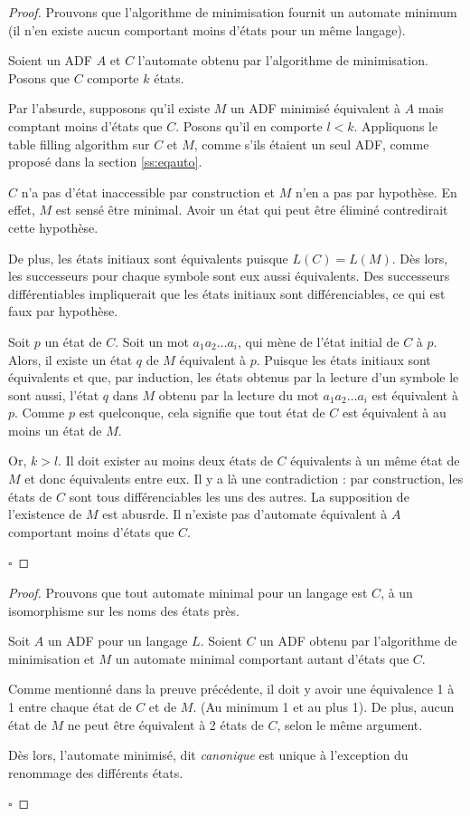 \begin{proof}
 Prouvons que l'algorithme de minimisation fournit un automate minimum (il n'en existe aucun comportant moins d'états pour un même langage).

 Soient un ADF $A$ et $C$ l'automate obtenu par l'algorithme de minimisation. Posons que $C$ comporte $k$ états.

 Par l'absurde, supposons qu'il existe $M$ un ADF minimisé équivalent à $A$ mais comptant moins d'états que $C$. Posons qu'il en comporte $l<k$. Appliquons le table filling algorithm sur $C$ et $M$, comme s'ils étaient un seul ADF, comme proposé dans la section \ref{ss:eqauto}.

 $C$ n'a pas d'état inaccessible par construction et $M$ n'en a pas par hypothèse. En effet, $M$ est sensé être minimal. Avoir un état qui peut être éliminé contredirait cette hypothèse.

 De plus, les états initiaux sont équivalents puisque $L(C)=L(M)$. Dès lors, les successeurs pour chaque symbole sont eux aussi équivalents. Des successeurs différentiables impliquerait que les états initiaux sont différenciables, ce qui est faux par hypothèse.

 Soit $p$ un état de $C$. Soit un mot $a_1a_2\dots a_i$, qui mène de l'état initial de $C$ à $p$. Alors, il existe un état $q$ de $M$ équivalent à $p$. Puisque les états initiaux sont équivalents et que, par induction, les états obtenus par la lecture d'un symbole le sont aussi, l'état $q$ dans $M$ obtenu par la lecture du mot $a_1a_2\dots a_i$ est équivalent à $p$.
 Comme $p$ est quelconque, cela signifie que tout état de $C$ est équivalent à au moins un état de $M$.

 Or, $k>l$. Il doit exister au moins deux états de $C$ équivalents à un même état de $M$ et donc équivalents entre eux. Il y a là une contradiction : par construction, les états de $C$ sont tous différenciables les uns des autres. La supposition de l'existence de $M$ est abusrde. Il n'existe pas d'automate équivalent à $A$ comportant moins d'états que $C$.

 \hfill$\square$
\end{proof}

\begin{proof}
 Prouvons que tout automate minimal pour un langage est $C$, à un isomorphisme sur les noms des états près.

 Soit $A$ un ADF pour un langage $L$. Soient $C$ un ADF obtenu par l'algorithme de minimisation et $M$ un automate minimal comportant autant d'états que $C$.

 Comme mentionné dans la preuve précédente, il doit y avoir une équivalence 1 à 1 entre chaque état de $C$ et de $M$. (Au minimum 1 et au plus 1). De plus, aucun état de $M$ ne peut être équivalent à 2 états de $C$, selon le même argument.

 Dès lors, l'automate minimisé, dit \emph{canonique} est unique à l'exception du renommage des différents états.

 \hfill$\square$
\end{proof}

